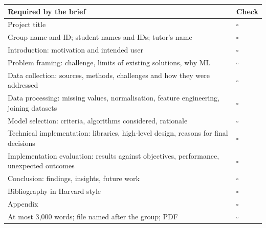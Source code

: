 \begin{center}
\small
\begin{tabularx}{\textwidth}{@{}Y C{1.4cm}@{}}
\toprule
\textbf{Required by the brief} & \textbf{Check} \\
\midrule
Project title & $\square$ \\
Group name and ID; student names and IDs; tutor's name & $\square$ \\
Introduction: motivation and intended user & $\square$ \\
Problem framing: challenge, limits of existing solutions, why ML & $\square$ \\
Data collection: sources, methods, challenges and how they were addressed & $\square$ \\
Data processing: missing values, normalisation, feature engineering, joining datasets & $\square$ \\
Model selection: criteria, algorithms considered, rationale & $\square$ \\
Technical implementation: libraries, high-level design, reasons for final decisions & $\square$ \\
Implementation evaluation: results against objectives, performance, unexpected outcomes & $\square$ \\
Conclusion: findings, insights, future work & $\square$ \\
Bibliography in Harvard style & $\square$ \\
Appendix & $\square$ \\
At most 3,000 words; file named after the group; PDF & $\square$ \\
\bottomrule
\end{tabularx}
\end{center}
